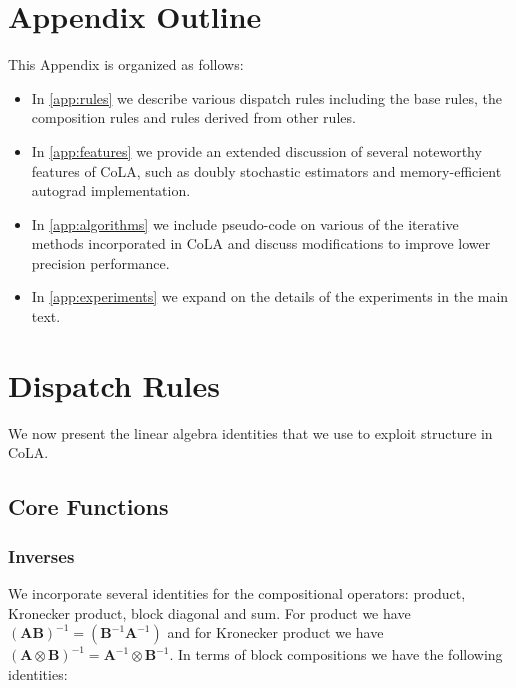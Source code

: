 \documentclass{article}
\newcommand{\mbf}[1]{{\boldsymbol{\mathbf{#1}}}}
\renewcommand{\bm}{\mbf}
\begin{document}
\appendix

\section*{Appendix Outline}

This Appendix is organized as follows:
\begin{itemize}
    \item In \autoref{app:rules} we describe various dispatch rules including the base rules, the composition rules and rules derived from other rules.
    \item In \autoref{app:features} we provide an extended discussion of several noteworthy features of CoLA, such as doubly stochastic estimators and memory-efficient autograd implementation.
    \item In \autoref{app:algorithms} we include pseudo-code on various of the iterative methods incorporated in CoLA and discuss modifications to improve lower precision performance.
    \item In \autoref{app:experiments} we expand on the details of the experiments in the main text.
\end{itemize}

\section{Dispatch Rules} \label{app:rules}
We now present the linear algebra identities that we use to exploit structure in CoLA.

\subsection{Core Functions}
\subsubsection{Inverses}
We incorporate several identities for the compositional operators: product, Kronecker product, block diagonal and sum.
For product we have $(\bm A\bm B)^{-1} = (\bm B^{-1}\bm A^{-1})$ and
for Kronecker product we have
$(\bm A\otimes \bm B)^{-1} = \bm A^{-1}\otimes \bm B^{-1}$.
In terms of block compositions we have the following identities:
\end{document}
